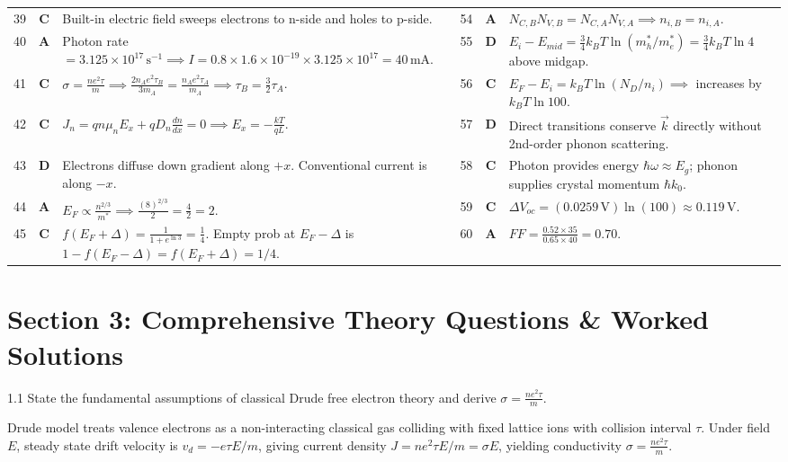 \begin{table}[htbp]
\begin{tabularx}{\textwidth}{l c X l c X}
39 & \textbf{C} & Built-in electric field sweeps electrons to n-side and holes to p-side. & 54 & \textbf{A} & $N_{C,B} N_{V,B} = N_{C,A} N_{V,A} \implies n_{i,B} = n_{i,A}$. \\
40 & \textbf{A} & Photon rate $= 3.125\times 10^{17}\,\text{s}^{-1} \implies I = 0.8\times 1.6\times 10^{-19}\times 3.125\times 10^{17} = 40\,\text{mA}$. & 55 & \textbf{D} & $E_i - E_{mid} = \frac{3}{4}k_BT\ln(m_h^*/m_e^*) = \frac{3}{4}k_BT\ln 4$ above midgap. \\
41 & \textbf{C} & $\sigma = \frac{n e^2 \tau}{m} \implies \frac{2 n_A e^2 \tau_B}{3 m_A} = \frac{n_A e^2 \tau_A}{m_A} \implies \tau_B = \frac{3}{2}\tau_A$. & 56 & \textbf{C} & $E_F - E_i = k_BT\ln(N_D/n_i) \implies$ increases by $k_BT\ln 100$. \\
42 & \textbf{C} & $J_n = q n \mu_n E_x + q D_n \frac{dn}{dx} = 0 \implies E_x = -\frac{kT}{qL}$. & 57 & \textbf{D} & Direct transitions conserve $\vec{k}$ directly without 2nd-order phonon scattering. \\
43 & \textbf{D} & Electrons diffuse down gradient along $+x$. Conventional current is along $-x$. & 58 & \textbf{C} & Photon provides energy $\hbar\omega \approx E_g$; phonon supplies crystal momentum $\hbar k_0$. \\
44 & \textbf{A} & $E_F \propto \frac{n^{2/3}}{m^*} \implies \frac{(8)^{2/3}}{2} = \frac{4}{2} = 2$. & 59 & \textbf{C} & $\Delta V_{oc} = (0.0259\,\text{V})\ln(100) \approx 0.119\,\text{V}$. \\
45 & \textbf{C} & $f(E_F+\Delta) = \frac{1}{1+e^{\ln 3}} = \frac{1}{4}$. Empty prob at $E_F-\Delta$ is $1-f(E_F-\Delta) = f(E_F+\Delta) = 1/4$. & 60 & \textbf{A} & $FF = \frac{0.52 \times 35}{0.65 \times 40} = 0.70$. \\
\bottomrule
\end{tabularx}
\end{table}

\newpage
\section{Section 3: Comprehensive Theory Questions \& Worked Solutions}
\begin{theoryq}{1.1}
State the fundamental assumptions of classical Drude free electron theory and derive $\sigma = \frac{ne^2\tau}{m}$.
\end{theoryq}

\begin{theorysol}
Drude model treats valence electrons as a non-interacting classical gas colliding with fixed lattice ions with collision interval $\tau$. Under field $E$, steady state drift velocity is $v_d = -e\tau E/m$, giving current density $J = ne^2\tau E/m = \sigma E$, yielding conductivity $\sigma = \frac{ne^2\tau}{m}$.
\end{theorysol}

